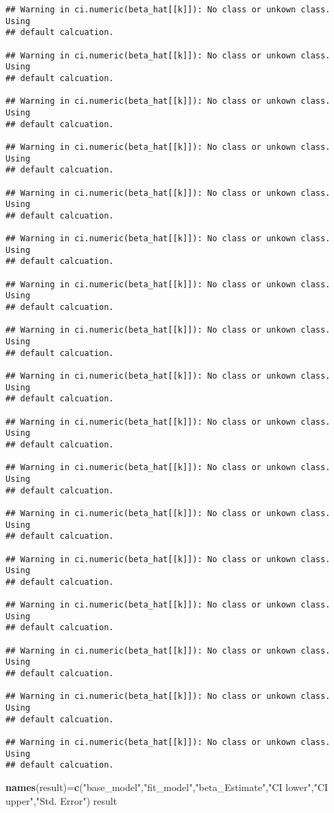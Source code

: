 \documentclass[]{article}
\newenvironment{Shaded}{\begin{snugshade}}{\end{snugshade}}
\newcommand{\KeywordTok}[1]{\textcolor[rgb]{0.13,0.29,0.53}{\textbf{#1}}}
\newcommand{\StringTok}[1]{\textcolor[rgb]{0.31,0.60,0.02}{#1}}
\newcommand{\NormalTok}[1]{#1}
\begin{document}
\begin{verbatim}
## Warning in ci.numeric(beta_hat[[k]]): No class or unkown class. Using
## default calcuation.

## Warning in ci.numeric(beta_hat[[k]]): No class or unkown class. Using
## default calcuation.

## Warning in ci.numeric(beta_hat[[k]]): No class or unkown class. Using
## default calcuation.

## Warning in ci.numeric(beta_hat[[k]]): No class or unkown class. Using
## default calcuation.

## Warning in ci.numeric(beta_hat[[k]]): No class or unkown class. Using
## default calcuation.

## Warning in ci.numeric(beta_hat[[k]]): No class or unkown class. Using
## default calcuation.

## Warning in ci.numeric(beta_hat[[k]]): No class or unkown class. Using
## default calcuation.

## Warning in ci.numeric(beta_hat[[k]]): No class or unkown class. Using
## default calcuation.

## Warning in ci.numeric(beta_hat[[k]]): No class or unkown class. Using
## default calcuation.

## Warning in ci.numeric(beta_hat[[k]]): No class or unkown class. Using
## default calcuation.

## Warning in ci.numeric(beta_hat[[k]]): No class or unkown class. Using
## default calcuation.

## Warning in ci.numeric(beta_hat[[k]]): No class or unkown class. Using
## default calcuation.

## Warning in ci.numeric(beta_hat[[k]]): No class or unkown class. Using
## default calcuation.

## Warning in ci.numeric(beta_hat[[k]]): No class or unkown class. Using
## default calcuation.

## Warning in ci.numeric(beta_hat[[k]]): No class or unkown class. Using
## default calcuation.

## Warning in ci.numeric(beta_hat[[k]]): No class or unkown class. Using
## default calcuation.

## Warning in ci.numeric(beta_hat[[k]]): No class or unkown class. Using
## default calcuation.
\end{verbatim}

\begin{Shaded}
\begin{Highlighting}[]
\KeywordTok{names}\NormalTok{(result)=}\KeywordTok{c}\NormalTok{(}\StringTok{"base_model"}\NormalTok{,}\StringTok{"fit_model"}\NormalTok{,}\StringTok{"beta_Estimate"}\NormalTok{,}\StringTok{"CI lower"}\NormalTok{,}\StringTok{"CI upper"}\NormalTok{,}\StringTok{"Std. Error"}\NormalTok{)}
\NormalTok{result}
\end{Highlighting}
\end{Shaded}
\end{document}
